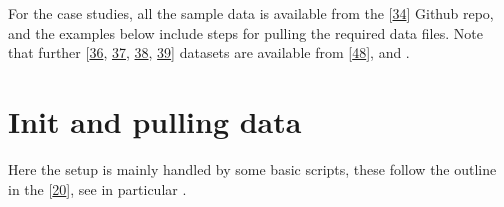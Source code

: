 \documentclass[letterpaper,table,10pt,english]{jupyterBook}
\begin{document}
\sphinxAtStartPar
For the case studies, all the sample data is available from the  {[}\hyperlink{cite.backmatter/bibliography:id608}{34}{]} Github repo, and the examples below include steps for pulling the required data files. Note that further  {[}\hyperlink{cite.backmatter/bibliography:id764}{36}, \hyperlink{cite.backmatter/bibliography:id628}{37}, \hyperlink{cite.backmatter/bibliography:id805}{38}, \hyperlink{cite.backmatter/bibliography:id767}{39}{]} datasets are available from  {[}\hyperlink{cite.backmatter/bibliography:id679}{48}{]}, and .


\section{Init and pulling data}
\label{\detokenize{part2/basic_fitting_numerics_intro_260723:init-and-pulling-data}}
\sphinxAtStartPar
Here the setup is mainly handled by some basic scripts, these follow the outline in the  {[}\hyperlink{cite.backmatter/bibliography:id681}{20}{]}, see in particular .
\end{document}
